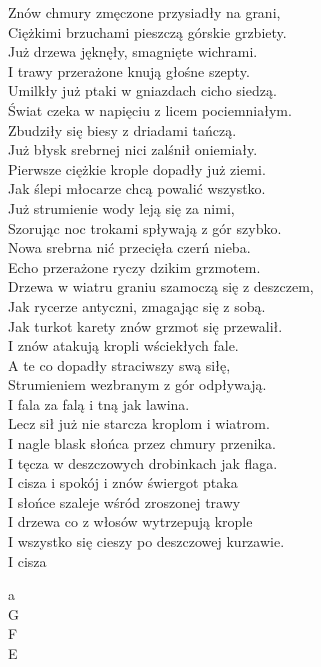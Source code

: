 \begin{text}
    Znów chmury zmęczone przysiadły na grani,\\
    Ciężkimi brzuchami pieszczą górskie grzbiety.\\
    Już drzewa jęknęły, smagnięte wichrami.\\
    I trawy przerażone knują głośne szepty.\\
    Umilkły już ptaki w gniazdach cicho siedzą.\\
    Świat czeka w napięciu z licem pociemniałym.\\
    Zbudziły się biesy z driadami tańczą.\\
    Już błysk srebrnej nici zalśnił oniemiały.\\
    Pierwsze ciężkie krople dopadły już ziemi.\\
    Jak ślepi młocarze chcą powalić wszystko.\\
    Już strumienie wody leją się za nimi,\\
    Szorując noc trokami spływają z gór szybko.\\
    Nowa srebrna nić przecięła czerń nieba.\\
    Echo przerażone ryczy dzikim grzmotem.\\
    Drzewa w wiatru graniu szamoczą się z deszczem,\\
    Jak rycerze antyczni, zmagając się z sobą.\\
    Jak turkot karety znów grzmot się przewalił.\\
    I znów atakują kropli wściekłych fale.\\
    A te co dopadły straciwszy swą siłę,\\
    Strumieniem wezbranym z gór odpływają.\\
    I fala za falą i tną jak lawina.\\
    Lecz sił już nie starcza kroplom i wiatrom.\\
    I nagle blask słońca przez chmury przenika.\\
    I tęcza w deszczowych drobinkach jak flaga.\\
    I cisza i spokój i znów świergot ptaka\\
    I słońce szaleje wśród zroszonej trawy\\
    I drzewa co z włosów wytrzepują krople\\
    I wszystko się cieszy po deszczowej kurzawie.\\
    I cisza
\end{text}
\begin{chord}
    a\\
    G\\
    F\\
    E
\end{chord}